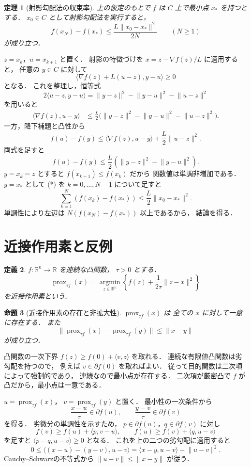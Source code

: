 \documentclass[a5paper,10pt,onecolumn]{jsarticle}
\makeatletter
\theoremstyle{mathnotetheorem}
\newtheorem{theorem}{定理}[section]
\newtheorem{definition}[theorem]{定義}
\newtheorem{proposition}[theorem]{命題}
\renewcommand{\proofname}{証明}
\renewenvironment{proof}[1][\proofname]{%
  \par\pushQED{\qed}\normalfont\topsep4\p@\@plus2\p@\relax
  \trivlist\item[\hskip\labelsep\bfseries #1]\ignorespaces
}{\popQED\endtrivlist\@endpefalse}
\newcommand{\norm}[1]{\lVert #1\rVert}
\makeatother
\begin{document}
\begin{theorem}[射影勾配法の収束率]\label{thm:proj-rate}
上の仮定のもとで $f$ は $C$ 上で最小点 $x_*$ を持つとする．
$x_0\in C$ として射影勾配法を実行すると，
\[
 f(x_N)-f(x_*)\le
 \frac{L\norm{x_0-x_*}^2}{2N}\qquad(N\ge1)
\]
が成り立つ．
\end{theorem}
\begin{proof}
$z=x_k$，$u=x_{k+1}$ と置く．
射影の特徴づけを
$x=z-\nabla f(z)/L$ に適用すると，
任意の $y\in C$ に対して
\[
 \langle\nabla f(z)+L(u-z),y-u\rangle\ge0
\]
となる．
これを整理し，恒等式
\[
 2\langle u-z,y-u\rangle
 =\norm{y-z}^2-\norm{y-u}^2-\norm{u-z}^2
\]
を用いると
\begin{align*}
 \langle\nabla f(z),u-y\rangle
 &\le\frac L2\bigl(
 \norm{y-z}^2-\norm{y-u}^2-\norm{u-z}^2
 \bigr).
\end{align*}
一方，降下補題と凸性から
\[
 f(u)-f(y)
 \le\langle\nabla f(z),u-y\rangle
 +\frac L2\norm{u-z}^2.
\]
両式を足すと
\[
 f(u)-f(y)
 \le\frac L2(\norm{y-z}^2-\norm{y-u}^2).
 \tag{*}
\]
$y=x_k=z$ とすると $f(x_{k+1})\le f(x_k)$ だから
関数値は単調非増加である．
$y=x_*$ として (*) を $k=0,\dots,N-1$ について足すと
\[
 \sum_{k=1}^N(f(x_k)-f(x_*))
 \le\frac L2\norm{x_0-x_*}^2.
\]
単調性により左辺は
$N(f(x_N)-f(x_*))$ 以上であるから，
結論を得る．
\end{proof}

\section{近接作用素と反例}

\begin{definition}
$f:\mathbb R^n\to\mathbb R$ を連続な凸関数，
$\tau>0$ とする．
\[
 \operatorname{prox}_{\tau f}(x)
 =\operatorname*{argmin}_{z\in\mathbb R^n}
 \left\{f(z)+\frac1{2\tau}\norm{z-x}^2\right\}
\]
を\emph{近接作用素}という．
\end{definition}

\begin{proposition}[近接作用素の存在と非拡大性]
\label{prop:prox}
$\operatorname{prox}_{\tau f}(x)$ は
全ての $x$ に対して一意に存在する．
また
\[
 \norm{\operatorname{prox}_{\tau f}(x)
       -\operatorname{prox}_{\tau f}(y)}
 \le\norm{x-y}
\]
が成り立つ．
\end{proposition}
\begin{proof}
凸関数の一次下界
$f(z)\ge f(0)+\langle v,z\rangle$ を取れる．
連続な有限値凸関数は劣勾配を持つので，
例えば $v\in\partial f(0)$ を取ればよい．
従って目的関数は二次項によって強制的であり，
連続なので最小点が存在する．
二次項が厳密凸で $f$ が凸だから，最小点は一意である．

$u=\operatorname{prox}_{\tau f}(x)$，
$v=\operatorname{prox}_{\tau f}(y)$ と置く．
最小性の一次条件から
\[
 \frac{x-u}{\tau}\in\partial f(u),\qquad
 \frac{y-v}{\tau}\in\partial f(v)
\]
を得る．
劣微分の単調性を示すため，
$p\in\partial f(u)$，$q\in\partial f(v)$ に対し
\[
 f(v)\ge f(u)+\langle p,v-u\rangle,\qquad
 f(u)\ge f(v)+\langle q,u-v\rangle
\]
を足すと
$\langle p-q,u-v\rangle\ge0$ となる．
これを上の二つの劣勾配に適用すると
\[
 0\le\langle(x-u)-(y-v),u-v\rangle
 =\langle x-y,u-v\rangle-\norm{u-v}^2.
\]
Cauchy--Schwarzの不等式から
$\norm{u-v}\le\norm{x-y}$ が従う．
\end{proof}
\end{document}
